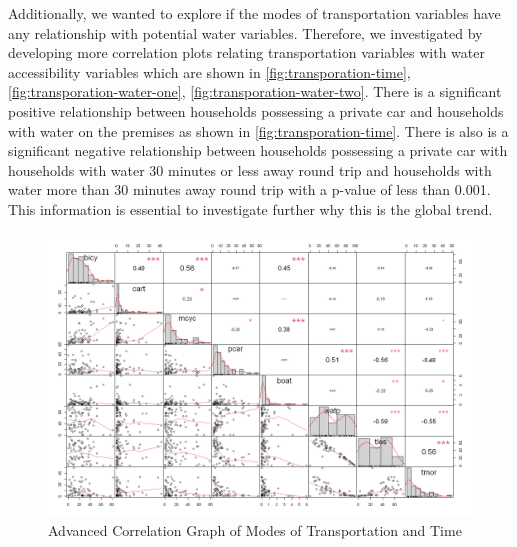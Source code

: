 \documentclass[10pt,twoside]{article}
\numberwithin{equation}{section}
\newcommand{\?}{\stackrel{?}{=}}
\begin{document}
Additionally, we wanted to explore if the modes of transportation variables have any relationship with potential water variables. Therefore, we investigated by developing more correlation plots relating transportation variables with water accessibility variables which are shown in \autoref{fig:transporation-time}, \autoref{fig:transporation-water-one}, \autoref{fig:transporation-water-two}. There is a significant positive relationship between households possessing a private car and households with water on the premises as shown in \autoref{fig:transporation-time}. There is also is a significant negative relationship between households possessing a private car with households with water 30 minutes or less away round trip and households with water more than 30 minutes away round trip with a p-value of less than 0.001. This information is essential to investigate further why this is the global trend. 


\begin{figure}[h!]
  \centering
  \includegraphics[width=.7\textwidth]{transportation-time}
  \caption{Advanced Correlation Graph of Modes of Transportation and Time}
  \label{fig:transporation-time}
\end{figure}
\end{document}
